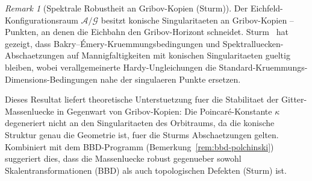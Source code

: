 \documentclass[12pt,a4paper]{article}
\theoremstyle{definition}
\theoremstyle{plain}
\theoremstyle{remark}
\newtheorem{remark}[definition]{Remark}
\begin{document}
\begin{remark}[Spektrale Robustheit an Gribov-Kopien (Sturm)]
\label{rem:sturm-gribov}
Der Eichfeld-Konfigurationsraum $\mathcal{A}/\mathcal{G}$ besitzt konische Singularitaeten an Gribov-Kopien -- Punkten, an denen die Eichbahn den Gribov-Horizont schneidet. Sturm~\cite{Sturm2025} hat gezeigt, dass Bakry--\'Emery-Kruemmungsbedingungen und Spektralluecken-Abschaetzungen auf Mannigfaltigkeiten mit konischen Singularitaeten gueltig bleiben, wobei verallgemeinerte Hardy-Ungleichungen die Standard-Kruemmungs-Dimensions-Bedingungen nahe der singulaeren Punkte ersetzen.

Dieses Resultat liefert theoretische Unterstuetzung fuer die Stabilitaet der Gitter-Massenluecke in Gegenwart von Gribov-Kopien: Die Poincar\'e-Konstante $\kappa$ degeneriert nicht an den Singularitaeten des Orbitraums, da die konische Struktur genau die Geometrie ist, fuer die Sturms Abschaetzungen gelten. Kombiniert mit dem BBD-Programm (Bemerkung~\ref{rem:bbd-polchinski}) suggeriert dies, dass die Massenluecke robust gegenueber sowohl Skalentransformationen (BBD) als auch topologischen Defekten (Sturm) ist.
\end{remark}

\begin{center}
\end{center}
\end{document}
